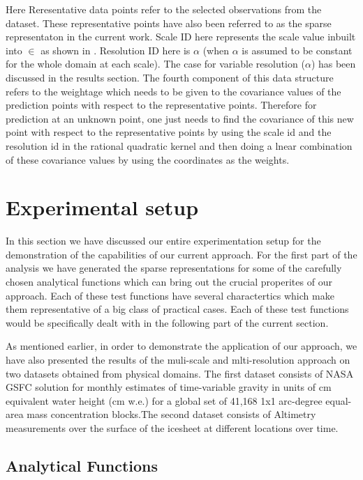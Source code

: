\documentclass[procedia]{easychair}
\begin{document}
 Here Reresentative data points refer to the selected observations from the dataset. These representative points have also been referred to as the sparse representaton in the current work. Scale ID here represents the scale value inbuilt into $\in$ as shown in \cite{patra2016multilevel}. Resolution ID here is $\alpha$ (when $\alpha$ is assumed to be constant for the whole domain at each scale). The case for variable resolution ($\alpha$) has been discussed in the results section. The fourth component of this data structure refers to the weightage which needs to be given to the covariance values of the prediction points with respect to the representative points. Therefore for prediction at an unknown point, one just needs to find the covariance of this new point with respect to the representative points by using the scale id and the resolution id  in the rational quadratic kernel and then doing a lnear combination of these covariance values by using the coordinates as the weights.



\section{Experimental setup}
In this section we have discussed our entire experimentation setup for the demonstration of the capabilities of our current approach. For the first part of the analysis we have generated the sparse representations for some of the carefully chosen analytical functions which can bring out the crucial properites of our approach. Each of these test functions have several charactertics which make them representative of a big class of practical cases. Each of these test functions would be specifically dealt with in the following part of the current section. 

As mentioned earlier, in order to demonstrate the application of our approach, we have also presented the results of the muli-scale and mlti-resolution approach on two datasets obtained from physical domains. The first dataset consists of NASA GSFC solution for monthly estimates of time-variable gravity in units of cm equivalent water height (cm w.e.) for a global set of 41,168 1x1 arc-degree equal-area mass concentration blocks.The  second dataset consists of Altimetry measurements over the surface of the icesheet at different locations over time. 

\subsection{Analytical Functions}
\end{document}
